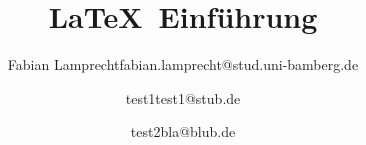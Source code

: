 

    \usepackage{cmbright}
    \usepackage[T1]{fontenc}
    \usepackage[utf8]{inputenc}
    \usepackage[german]{babel}
    \usepackage{amssymb}
    \usepackage{amsmath}
    \usepackage{amsfonts}
    \usepackage{cleveref}
    \usepackage{verbatim}
    \usepackage{multicol}
    \usepackage{listings}
    \usepackage{wasysym}
    \usepackage{eurosym}
    \usepackage{tcolorbox}

    

\newcommand\todo[1]{%
    \refstepcounter{todo} 
    \mytodobox{\hypertarget{todo\thetodo}{#1}}
    \addcontentsline{tod}{subsection}{\protect\hyperlink{todo\thetodo}{\thetodo~#1}\par} 
}%

\makeatletter
\newcommand\listoftodos{%
    \@starttoc{tod}}
\makeatother
    



\newcommand\black{\color{black}}
\newcommand\cred{\color{cred}}
\newcommand\cpurple{\color{cpurple}}
\newcommand\cturkis{\color{cturkis}}
\newcommand\cblue{\color{cblue}}


\author[Fabian Lamprecht \and test1 \and test2]{{Fabian Lamprecht\newline\footnotesize fabian.lamprecht@stud.uni-bamberg.de}\vspace{2.5mm}\newline\and{test1\newline\footnotesize test1@stub.de}\vspace{2.5mm}\newline\and{test2\newline\footnotesize bla@blub.de}}
\title{\LaTeX~Einf\"uhrung}



